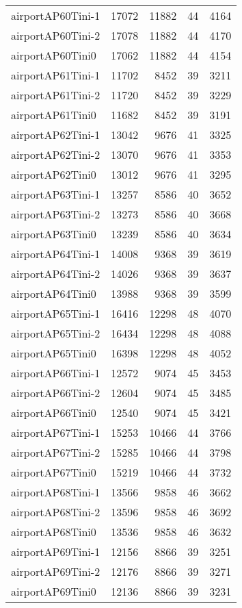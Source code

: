 \begin{longtable}{lrrrr}
airportAP60Tini-1 & 17072 & 11882 & 44 & 4164 \\
airportAP60Tini-2 & 17078 & 11882 & 44 & 4170 \\
airportAP60Tini0 & 17062 & 11882 & 44 & 4154 \\
airportAP61Tini-1 & 11702 & 8452 & 39 & 3211 \\
airportAP61Tini-2 & 11720 & 8452 & 39 & 3229 \\
airportAP61Tini0 & 11682 & 8452 & 39 & 3191 \\
airportAP62Tini-1 & 13042 & 9676 & 41 & 3325 \\
airportAP62Tini-2 & 13070 & 9676 & 41 & 3353 \\
airportAP62Tini0 & 13012 & 9676 & 41 & 3295 \\
airportAP63Tini-1 & 13257 & 8586 & 40 & 3652 \\
airportAP63Tini-2 & 13273 & 8586 & 40 & 3668 \\
airportAP63Tini0 & 13239 & 8586 & 40 & 3634 \\
airportAP64Tini-1 & 14008 & 9368 & 39 & 3619 \\
airportAP64Tini-2 & 14026 & 9368 & 39 & 3637 \\
airportAP64Tini0 & 13988 & 9368 & 39 & 3599 \\
airportAP65Tini-1 & 16416 & 12298 & 48 & 4070 \\
airportAP65Tini-2 & 16434 & 12298 & 48 & 4088 \\
airportAP65Tini0 & 16398 & 12298 & 48 & 4052 \\
airportAP66Tini-1 & 12572 & 9074 & 45 & 3453 \\
airportAP66Tini-2 & 12604 & 9074 & 45 & 3485 \\
airportAP66Tini0 & 12540 & 9074 & 45 & 3421 \\
airportAP67Tini-1 & 15253 & 10466 & 44 & 3766 \\
airportAP67Tini-2 & 15285 & 10466 & 44 & 3798 \\
airportAP67Tini0 & 15219 & 10466 & 44 & 3732 \\
airportAP68Tini-1 & 13566 & 9858 & 46 & 3662 \\
airportAP68Tini-2 & 13596 & 9858 & 46 & 3692 \\
airportAP68Tini0 & 13536 & 9858 & 46 & 3632 \\
airportAP69Tini-1 & 12156 & 8866 & 39 & 3251 \\
airportAP69Tini-2 & 12176 & 8866 & 39 & 3271 \\
airportAP69Tini0 & 12136 & 8866 & 39 & 3231 \\

\end{longtable}
